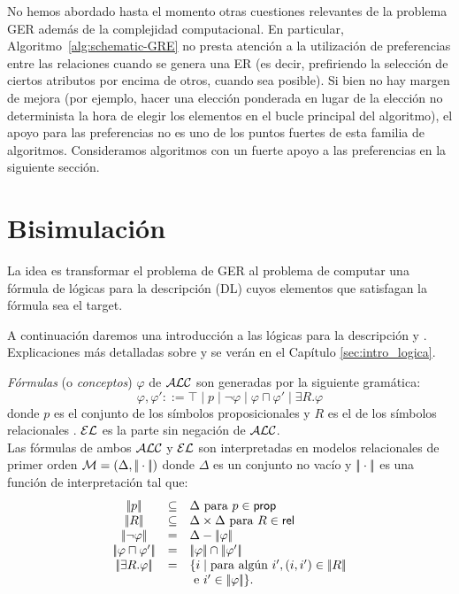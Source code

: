 No hemos abordado hasta el momento otras cuestiones relevantes de la
problema GER adem\'as de la complejidad computacional. En particular,
Algoritmo~\ref{alg:schematic-GRE} no presta atenci\'on a la utilizaci\'on de
preferencias entre las relaciones cuando se genera una ER (es decir, prefiriendo
la selecci\'on de ciertos atributos por encima de otros, cuando sea posible).
Si bien no hay margen de mejora (por ejemplo, hacer una elecci\'on ponderada
en lugar de la elecci\'on no determinista la hora de elegir los elementos
en el bucle principal del algoritmo), el apoyo para las preferencias no es
uno de los puntos fuertes de esta familia de algoritmos.
Consideramos algoritmos con un fuerte apoyo a las preferencias en la siguiente secci\'on.


\section{Bisimulaci\'on}
\label{sec:bisimulacion}


La idea es transformar el problema de GER al problema de computar una f\'ormula de l\'ogicas para la descripci\'on (DL) cuyos elementos que satisfagan la f\'ormula sea el target.%

A continuaci\'on daremos una introducci\'on a las l\'ogicas para la descripci\'on \alc y \el. Explicaciones m\'as detalladas sobre \alc y \el se ver\'an en el Cap\'itulo \ref{sec:intro_logica}.

\emph{F\'ormulas} (o \emph{conceptos}) $\varphi$ de $\mathcal{ALC}$ son generadas por la siguiente gram\'atica:
$$
\varphi,\varphi' ::= \top \mid p \mid \neg \varphi \mid \varphi \sqcap \varphi'
\mid \exists R. \varphi
$$
donde $p$ es el conjunto de los s\'imbolos proposicionales \prop y $R$ es el de los s\'imbolos relacionales \rel. $\mathcal{EL}$ es la parte sin negaci\'on de $\mathcal{ALC}$.\\

Las f\'ormulas de ambos $\mathcal{ALC}$ y $\mathcal{EL}$ son interpretadas en modelos relacionales de primer orden $\mathcal{M} = (\Delta,|\!|\cdot|\!|)$ donde
$\Delta$ es un conjunto no vac\'io y $|\!|\cdot|\!|$ es una funci\'on de interpretaci\'on tal que:
$$
\begin{array}{ccl}
\interp{p} & \subseteq & \Delta  \mbox{ para $p \in \prop$}\\
\interp{R} & \subseteq & \Delta \times \Delta  \mbox{ para $R \in \rel$}\\
\interp{\neg \varphi} & = & \Delta - \interp{\varphi}\\
\interp{\varphi \sqcap \varphi'} & = & \interp{\varphi} \cap \interp{\varphi'}\\
\interp{\exists R.\varphi} & = & \{i \mid \mbox{para alg\'un } i', (i,i') \in \interp{R}\\
& & \mbox{ e } i' \in \interp{\varphi} \}.\\
\end{array}
$$


